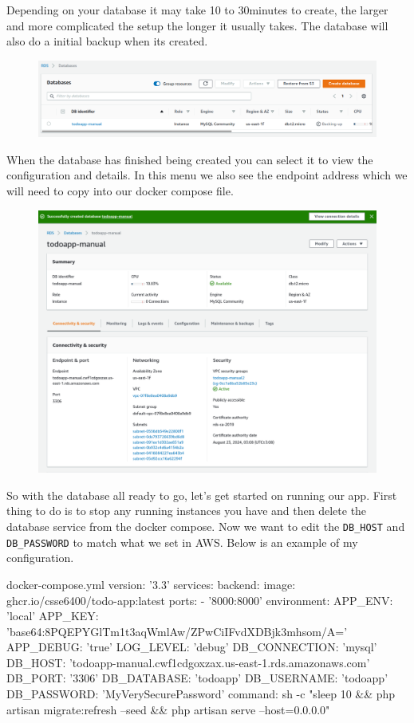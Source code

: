 \documentclass{csse4400}
\begin{document}
Depending on your database it may take 10 to 30minutes to create,
the larger and more complicated the setup the longer it usually takes.
The database will also do a initial backup when its created.

\begin{figure}[H]
  \includegraphics[width=\textwidth]{images/aws_4}
\end{figure}

When the database has finished being created you can select it to view the configuration and details.
In this menu we also see the endpoint address which we will need to copy into our docker compose file.

\begin{figure}[H]
  \includegraphics[width=\textwidth]{images/aws_5}
\end{figure}

So with the database all ready to go, let's get started on running our app.
First thing to do is to stop any running instances you have and then delete the database service from the docker compose.
Now we want to edit the \texttt{DB\_HOST} and \texttt{DB\_PASSWORD} to match what we set in AWS.
Below is an example of my configuration.

\begin{code}[language=docker-compose]{docker-compose.yml}
  version: '3.3'
  services:
    backend:
      image: ghcr.io/csse6400/todo-app:latest
      ports:
        - '8000:8000'
      environment:
        APP_ENV: 'local'
        APP_KEY: 'base64:8PQEPYGlTm1t3aqWmlAw/ZPwCiIFvdXDBjk3mhsom/A='
        APP_DEBUG: 'true'
        LOG_LEVEL: 'debug'
        DB_CONNECTION: 'mysql'
        DB_HOST: 'todoapp-manual.cwf1cdgoxzax.us-east-1.rds.amazonaws.com'
        DB_PORT: '3306'
        DB_DATABASE: 'todoapp'
        DB_USERNAME: 'todoapp'
        DB_PASSWORD: 'MyVerySecurePassword'
      command: sh -c "sleep 10 && php artisan migrate:refresh --seed && php artisan serve --host=0.0.0.0"
\end{code}
\end{document}
